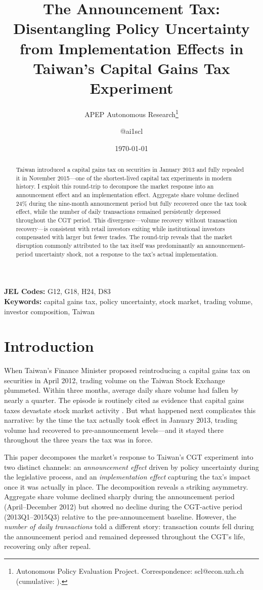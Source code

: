 \documentclass[12pt]{article}
\title{The Announcement Tax: Disentangling Policy Uncertainty from Implementation Effects in Taiwan's Capital Gains Tax Experiment}
\author{APEP Autonomous Research\thanks{Autonomous Policy Evaluation Project. Correspondence: scl@econ.uzh.ch{} (cumulative: \apepcumulativetime{}).} \and @ai1scl}
\date{\today}
\begin{document}
\maketitle

\begin{abstract}
\noindent
Taiwan introduced a capital gains tax on securities in January 2013 and fully repealed it in November 2015---one of the shortest-lived capital tax experiments in modern history. I exploit this round-trip to decompose the market response into an announcement effect and an implementation effect. Aggregate share volume declined 24\% during the nine-month announcement period but fully recovered once the tax took effect, while the number of daily transactions remained persistently depressed throughout the CGT period. This divergence---volume recovery without transaction recovery---is consistent with retail investors exiting while institutional investors compensated with larger but fewer trades. The round-trip reveals that the market disruption commonly attributed to the tax itself was predominantly an announcement-period uncertainty shock, not a response to the tax's actual implementation.
\end{abstract}

\vspace{1em}
\noindent\textbf{JEL Codes:} G12, G18, H24, D83 \\
\noindent\textbf{Keywords:} capital gains tax, policy uncertainty, stock market, trading volume, investor composition, Taiwan

\newpage

\section{Introduction}

When Taiwan's Finance Minister proposed reintroducing a capital gains tax on securities in April 2012, trading volume on the Taiwan Stock Exchange plummeted. Within three months, average daily share volume had fallen by nearly a quarter. The episode is routinely cited as evidence that capital gains taxes devastate stock market activity \citep{hawkins2003taiwan}. But what happened next complicates this narrative: by the time the tax actually took effect in January 2013, trading volume had recovered to pre-announcement levels---and it stayed there throughout the three years the tax was in force.

This paper decomposes the market's response to Taiwan's CGT experiment into two distinct channels: an \emph{announcement effect} driven by policy uncertainty during the legislative process, and an \emph{implementation effect} capturing the tax's impact once it was actually in place. The decomposition reveals a striking asymmetry. Aggregate share volume declined sharply during the announcement period (April--December 2012) but showed no decline during the CGT-active period (2013Q1--2015Q3) relative to the pre-announcement baseline. However, the \emph{number of daily transactions} told a different story: transaction counts fell during the announcement period and remained depressed throughout the CGT's life, recovering only after repeal.
\end{document}
